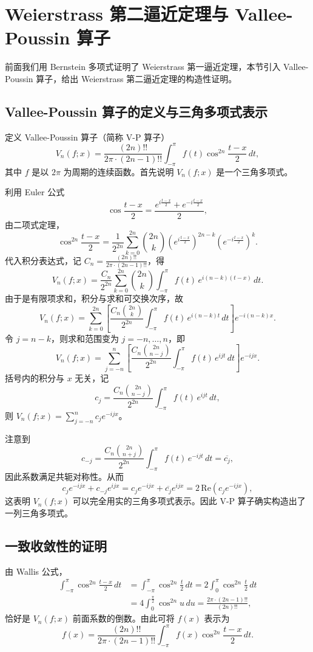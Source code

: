 \section{Weierstrass 第二逼近定理与 Vallee-Poussin 算子}

前面我们用 Bernstein 多项式证明了 Weierstrass 第一逼近定理，本节引入 Vallee-Poussin 算子，给出 Weierstrass 第二逼近定理的构造性证明。

\subsection{Vallee-Poussin 算子的定义与三角多项式表示}

定义 Vallee-Poussin 算子（简称 V-P 算子）
\[
V_n(f;x) = \frac{(2n)!!}{2\pi\cdot(2n-1)!!}\int_{-\pi}^{\pi} f(t)\cos^{2n}\frac{t-x}{2}\,dt,
\]
其中 $f$ 是以 $2\pi$ 为周期的连续函数。首先说明 $V_n(f;x)$ 是一个三角多项式。

利用 Euler 公式
\[
\cos\frac{t-x}{2} = \frac{e^{i\frac{t-x}{2}} + e^{-i\frac{t-x}{2}}}{2},
\]
由二项式定理，
\[
\cos^{2n}\frac{t-x}{2} = \frac{1}{2^{2n}} \sum_{k=0}^{2n} \binom{2n}{k} \left(e^{i\frac{t-x}{2}}\right)^{2n-k} \left(e^{-i\frac{t-x}{2}}\right)^k.
\]
代入积分表达式，记 $C_n = \frac{(2n)!!}{2\pi\cdot(2n-1)!!}$，得
\[
V_n(f;x) = \frac{C_n}{2^{2n}} \sum_{k=0}^{2n} \binom{2n}{k} \int_{-\pi}^{\pi} f(t)\, e^{i(n-k)(t-x)}\,dt.
\]
由于是有限项求和，积分与求和可交换次序，故
\[
V_n(f;x) = \sum_{k=0}^{2n} \left[ \frac{C_n \binom{2n}{k}}{2^{2n}} \int_{-\pi}^{\pi} f(t)\, e^{i(n-k)t}\,dt \right] e^{-i(n-k)x}.
\]
令 $j = n-k$，则求和范围变为 $j = -n, \dots, n$，即
\[
V_n(f;x) = \sum_{j=-n}^{n} \left[ \frac{C_n \binom{2n}{n-j}}{2^{2n}} \int_{-\pi}^{\pi} f(t)\, e^{ijt}\,dt \right] e^{-ijx}.
\]
括号内的积分与 $x$ 无关，记
\[
c_j = \frac{C_n \binom{2n}{n-j}}{2^{2n}} \int_{-\pi}^{\pi} f(t)\, e^{ijt}\,dt,
\]
则 $V_n(f;x) = \sum_{j=-n}^{n} c_j e^{-ijx}$。

注意到
\[
c_{-j} = \frac{C_n \binom{2n}{n+j}}{2^{2n}} \int_{-\pi}^{\pi} f(t)\, e^{-ijt}\,dt = \overline{c_j},
\]
因此系数满足共轭对称性。从而
\[
c_j e^{-ijx} + c_{-j} e^{ijx} = c_j e^{-ijx} + \overline{c_j} e^{ijx} = 2\,\text{Re}(c_j e^{-ijx}),
\]
这表明 $V_n(f;x)$ 可以完全用实的三角多项式表示。因此 V-P 算子确实构造出了一列三角多项式。

\subsection{一致收敛性的证明}

由 Wallis 公式，
\begin{align*}
\int_{-\pi}^{\pi} \cos^{2n}\frac{t-x}{2}\,dt
&= \int_{-\pi}^{\pi} \cos^{2n}\frac{t}{2}\,dt
= 2\int_{0}^{\pi} \cos^{2n}\frac{t}{2}\,dt \\
&= 4\int_{0}^{\frac{\pi}{2}} \cos^{2n} u\,du
= \frac{2\pi\cdot(2n-1)!!}{(2n)!!},
\end{align*}
恰好是 $V_n(f;x)$ 前面系数的倒数。由此可将 $f(x)$ 表示为
\[
f(x) = \frac{(2n)!!}{2\pi\cdot(2n-1)!!}\int_{-\pi}^{\pi} f(x)\cos^{2n}\frac{t-x}{2}\,dt.
\]

